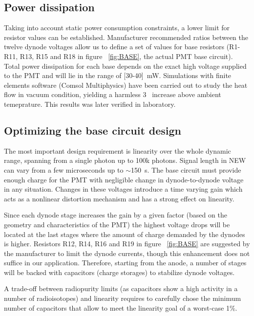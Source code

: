 \documentclass[a4paper, 10pt, oneside, twocolumn, 3p]{elsarticle}
\begin{document}
\subsection {Power dissipation}

\par Taking into account static power consumption constraints, a lower limit for resistor values can be established. Manufacturer recommended ratios between the twelve dynode voltages allow us to define a set of values for base resistors (R1-R11, R13, R15 and R18 in figure ~\ref{fig:BASE}, the actual PMT base circuit). Total power dissipation for each base depends on the exact high voltage supplied to the PMT and will lie in the range of [30-40]~mW. Simulations with finite elements software (Comsol Multiphysics) have been carried out to study the heat flow in vacuum condition, yielding a harmless 3~ increase above ambient temeprature. This results was later verified in laboratory.


\subsection {Optimizing the base circuit design}

\par The most important design requirement is linearity over the whole dynamic range, spanning from a single photon up to 100k photons. Signal length in NEW can vary from a few microseconds up to $\sim$150~\textmu s. The base circuit must provide enough charge for the PMT with negligible change in dynode-to-dynode voltage in any situation. Changes in these voltages introduce a time varying gain which acts as a nonlinear distortion mechanism and has a strong effect on linearity.

\par Since each dynode stage increases the gain by a given factor (based on the geometry and characteristics of the PMT) the highest voltage drops will be located at the last stages where the amount of charge demanded by the dynodes is higher. Resistors R12, R14, R16 and R19 in figure ~\ref{fig:BASE} are suggested by the manufacturer to limit the dynode currents, though this enhancement does not suffice in our application. Therefore, starting from the anode, a number of stages will be backed with capacitors (charge storages) to stabilize dynode voltages. 

\par A trade-off between radiopurity limits \cite{1029-8479}  (as capacitors show a high activity in a number of radioisotopes) and linearity requires to carefully chose the minimum number of capacitors that allow to meet the linearity goal of a \mbox{worst-case} 1\%. %
\end{document}
